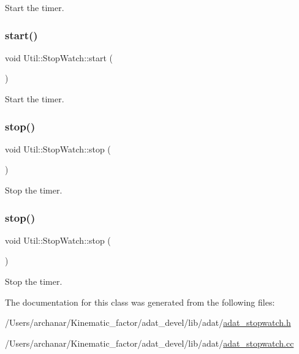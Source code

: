 Start the timer. 

\mbox{\label{classUtil_1_1StopWatch_a87db8057d5ddf177cfcc9ae497337d13}} 
\subsubsection{\texorpdfstring{start()}{start()}\hspace{0.1cm}{\footnotesize\ttfamily [2/2]}}
{\footnotesize\ttfamily void Util\+::\+Stop\+Watch\+::start (\begin{DoxyParamCaption}{ }\end{DoxyParamCaption})}



Start the timer. 

\mbox{\label{classUtil_1_1StopWatch_a8a89a1d02ece7c671ee1d9e9f42c88b2}} 
\subsubsection{\texorpdfstring{stop()}{stop()}\hspace{0.1cm}{\footnotesize\ttfamily [1/2]}}
{\footnotesize\ttfamily void Util\+::\+Stop\+Watch\+::stop (\begin{DoxyParamCaption}{ }\end{DoxyParamCaption})}



Stop the timer. 

\mbox{\label{classUtil_1_1StopWatch_a8a89a1d02ece7c671ee1d9e9f42c88b2}} 
\subsubsection{\texorpdfstring{stop()}{stop()}\hspace{0.1cm}{\footnotesize\ttfamily [2/2]}}
{\footnotesize\ttfamily void Util\+::\+Stop\+Watch\+::stop (\begin{DoxyParamCaption}{ }\end{DoxyParamCaption})}



Stop the timer. 



The documentation for this class was generated from the following files\+:\begin{DoxyCompactItemize}
\item 
/\+Users/archanar/\+Kinematic\+\_\+factor/adat\+\_\+devel/lib/adat/\mbox{\hyperlink{lib_2adat_2adat__stopwatch_8h}{adat\+\_\+stopwatch.\+h}}\item 
/\+Users/archanar/\+Kinematic\+\_\+factor/adat\+\_\+devel/lib/adat/\mbox{\hyperlink{adat__stopwatch_8cc}{adat\+\_\+stopwatch.\+cc}}\end{DoxyCompactItemize}
